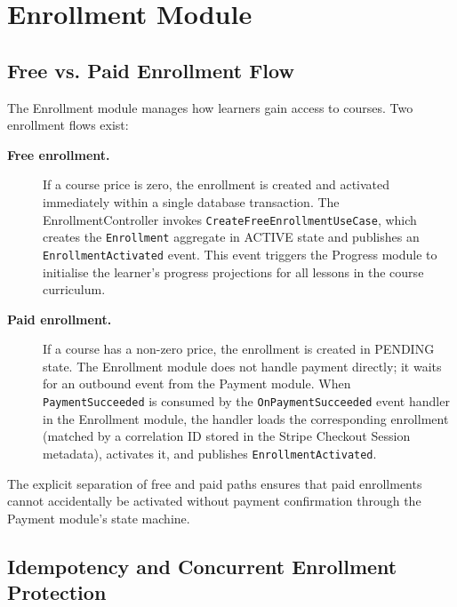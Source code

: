 
\section{Enrollment Module}
\label{sec:enrollment-module}

\subsection{Free vs. Paid Enrollment Flow}

The Enrollment module manages how learners gain access to courses. Two enrollment flows exist:

\begin{description}
  \item[\textbf{Free enrollment.}]
  If a course price is zero, the enrollment is created and activated immediately within a single database transaction. The EnrollmentController invokes \texttt{CreateFreeEnrollmentUseCase}, which creates the \texttt{Enrollment} aggregate in ACTIVE state and publishes an \texttt{EnrollmentActivated} event. This event triggers the Progress module to initialise the learner's progress projections for all lessons in the course curriculum.

  \item[\textbf{Paid enrollment.}]
  If a course has a non-zero price, the enrollment is created in PENDING state. The Enrollment module does not handle payment directly; it waits for an outbound event from the Payment module. When \texttt{PaymentSucceeded} is consumed by the \texttt{OnPaymentSucceeded} event handler in the Enrollment module, the handler loads the corresponding enrollment (matched by a correlation ID stored in the Stripe Checkout Session metadata), activates it, and publishes \texttt{EnrollmentActivated}.
\end{description}

The explicit separation of free and paid paths ensures that paid enrollments cannot accidentally be activated without payment confirmation through the Payment module's state machine.

\subsection{Idempotency and Concurrent Enrollment Protection}


